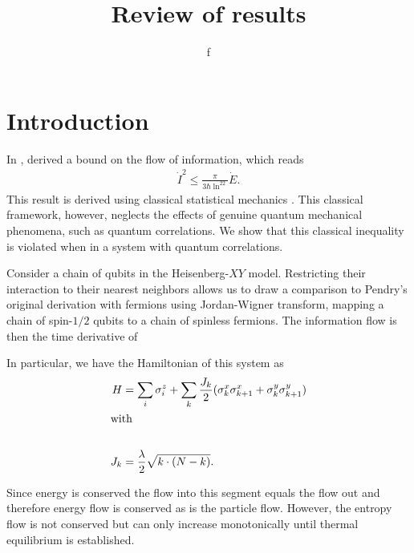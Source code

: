 \documentclass[a4paper,11pt]{scrartcl}
\author{f}
\title{Review of results}
\begin{document}
\maketitle
\section{Introduction}
In \citeyear{BA_Pendry_1983}, \citeauthor{BA_Pendry_1983} derived a bound on the flow of information, which reads
\begin{align}\label{eq:pendry}
    \dot{I}^2 \leq \frac{\pi}{3\hbar\ln^22}\dot{E}.
\end{align}
This result is derived using classical statistical mechanics \cite{BA_Pendry_1983}. This classical framework, however,
neglects the effects of genuine quantum mechanical phenomena, such as quantum correlations. We show that this
classical inequality is violated when in a system with quantum correlations.

Consider a chain of qubits in the Heisenberg-$XY$ model. Restricting their interaction to their nearest neighbors allows
us to draw a comparison to Pendry's original derivation with fermions using Jordan-Wigner transform, mapping a chain of
spin-$1/2$ qubits to a chain of spinless fermions. The information flow is then the time derivative of 

In particular, we have the Hamiltonian of this system as
\begin{align}\label{eq:hamiltonian-perfect-transfer}
    H &= \sum\limits_i \sigma^z_i + \sum\limits_k \frac{J_k}{2} (\sigma^x_k\sigma^x_{k+1}+\sigma^y_k\sigma^y_{k+1})\\
    \shortintertext{with}\\
    J_k &= \frac{\lambda}{2}\sqrt{k\cdot(N-k)}.\nonumber
\end{align}

\cite{BA_kaonan_correlations}

\begin{displayquote}
Since energy is conserved the flow into this segment equals the
flow out and therefore energy flow is conserved as is the particle flow. However,
the entropy flow is not conserved but can only increase monotonically until thermal
equilibrium is established.
\end{displayquote}


\printbibliography
\end{document}

